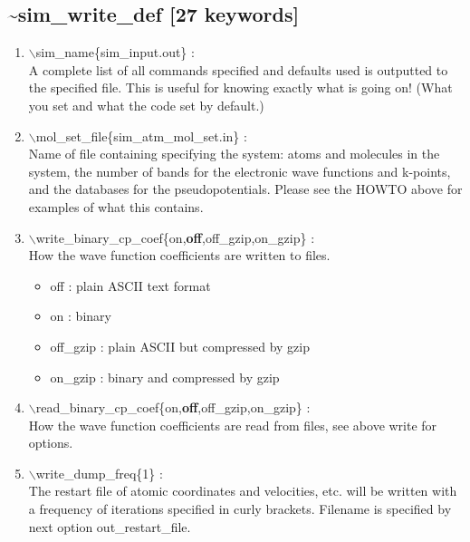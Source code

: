 \documentclass[12pt,titlepage]{article}
\begin{document}
\subsection*{\bf \~{}sim\_write\_def [27 keywords]}
\begin{enumerate}

 \vspace{0.15in} 
 \item   $\backslash$sim\_name\{sim\_input.out\} : \\
    A complete list of all commands specified and defaults used is outputted to the specified file.  This is useful for knowing exactly what is going on!  (What you set and what the code set by default.)

\vspace{0.15in} 
 \item   $\backslash$mol\_set\_file\{sim\_atm\_mol\_set.in\} : \\
    Name of file containing specifying the system: atoms and molecules in the system, the number of bands for the electronic wave functions and k-points, and the databases for the pseudopotentials.  Please see the HOWTO above for examples of what this contains.

\vspace{0.15in} 
 \item   $\backslash$write\_binary\_cp\_coef\{on,{\bf off},off\_gzip,on\_gzip\} : \\
 How the wave function coefficients are written to files.
 \begin{itemize}
\item off : plain ASCII text format
\item on : binary
\item off\_gzip : plain ASCII but compressed by gzip
\item on\_gzip : binary and compressed by gzip
 \end{itemize}
 
\vspace{0.15in} 
 \item   $\backslash$read\_binary\_cp\_coef\{on,{\bf off},off\_gzip,on\_gzip\} : \\
 How the wave function coefficients are read from files, see above write for options.



 \vspace{0.15in} 
 \item   $\backslash$write\_dump\_freq\{1\} : \\
     The restart file of atomic coordinates and velocities, etc. will be
     written with a frequency of iterations specified in curly brackets.  Filename is specified by
     next option out\_restart\_file.


\end{enumerate}
\end{document}
